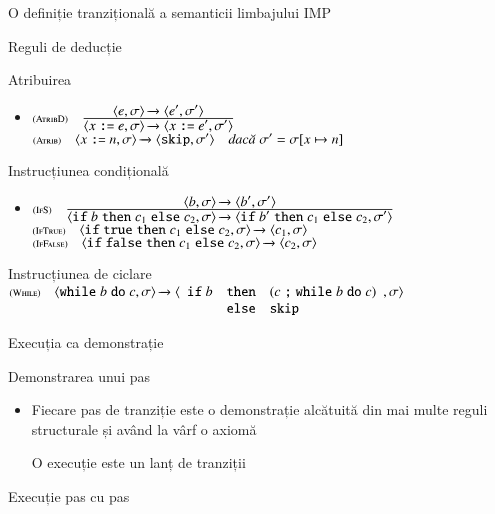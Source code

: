 \documentclass[handout,xcolor=pdftex,romanian,colorlinks]{beamer}
\begin{document}
\begin{section}{O definiție tranzițională a semanticii limbajului IMP}
\begin{subsection}{Reguli de deducție}
\begin{frame}
{Atribuirea}
\begin{itemize}
\item[] $\reg[AtribD]{\Ss{\c{x \terminal{:=} e ,\sigma}}{\c{x \terminal{:=} e' ,\sigma'}}}{\Ss{\c{e,\sigma}}{\c{e',\sigma'}}}{}$
\vitem[] $\reg[Atrib]{\Ss{\c{x \terminal{:=} n,\sigma}}{\c{\terminal{skip},\sigma'}}}{}{\sigma'=\sigma[x \mapsto n]}$
\end{itemize}
\end{frame}

\begin{frame}{Instrucțiunea condițională}
\begin{itemize}
\item[] 
$\reg[IfS]{
 \Ss{\c{\Sif {b} \Sthen c_1 \Selse c_2,\sigma}}{\c{\Sif  {b'} \Sthen c_1 \Selse c_2,\sigma'}}
}{
  \Ss{\c{b,\sigma}}{\c{b',\sigma'}}
}
{}$
\vitem[]
$\reg[IfTrue]{\Ss{\c{\Sif  {\terminal{true}} \Sthen c_1 \Selse c_2,\sigma}}{\c{c_1,\sigma}}}{}{}$ 
\vitem[]
$\reg[IfFalse]{\Ss{\c{\Sif {\terminal{false}} \Sthen c_1 \Selse c_2,\sigma}}{\c{c_2,\sigma}}}{}{}$ 

\end{itemize}
\end{frame}

\begin{frame}{Instrucțiunea de ciclare}
$\reg[While]{
 \Ss{\c{\Swhile {b} \Sdo c,\sigma}}{\c{\begin{array}[t]{lll}\Sif {b}&\Sthen &(c\terminal{;} {\Swhile {b} \Sdo c})\\& \Selse & {\terminal{skip}}\end{array},\sigma}}
}{}
{}$\end{frame}

\end{subsection}

\begin{subsection}{Execuția ca demonstrație}
\renewcommand{\bot}{\emptyset}
\begin{frame}{Demonstrarea unui pas}

\begin{itemize}
\item Fiecare pas de tranziție este o demonstrație alcătuită din mai multe reguli structurale și având la vârf o axiomă

\vitem O execuție este un lanț de tranziții 
\end{itemize}
\end{frame}

\begin{frame}
{Execuție pas cu pas}


\end{frame}
\end{subsection}
\end{section}
\end{document}
